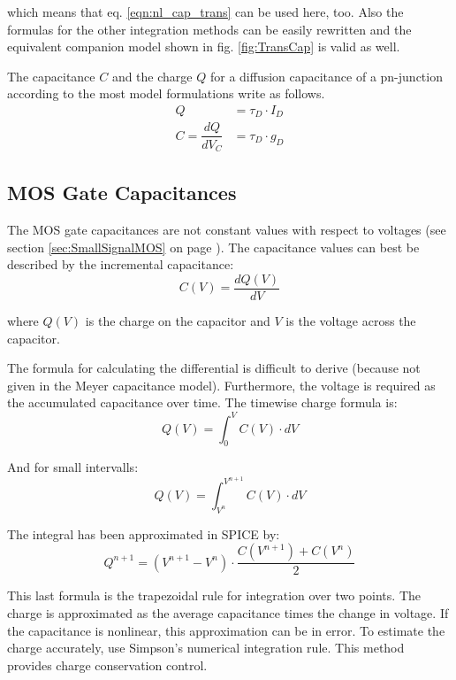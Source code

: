 which means that eq. \eqref{eqn:nl_cap_trans} can be used here, too.
Also the formulas for the other integration methods can be
easily rewritten and the equivalent companion model shown in
fig. \ref{fig:TransCap} is valid as well.

\addvspace{12pt}

The capacitance $C$ and the charge $Q$ for a diffusion capacitance of
a pn-junction according to the most model formulations write as
follows.
\begin{align}
Q &= \tau_D\cdot I_D\\
C = \dfrac{d Q}{d V_C} &= \tau_D\cdot g_D
\end{align}

\subsection{MOS Gate Capacitances}

The MOS gate capacitances are not constant values with respect to
voltages (see section \ref{sec:SmallSignalMOS} on page
\pageref{sec:SmallSignalMOS}). The capacitance values can best be
described by the incremental capacitance:
\begin{equation}
C(V) = \dfrac{d Q(V)}{d V}
\end{equation}

where $Q(V)$ is the charge on the capacitor and $V$ is the voltage
across the capacitor.

\addvspace{12pt}

The formula for calculating the differential is difficult to derive
(because not given in the Meyer capacitance model).  Furthermore, the
voltage is required as the accumulated capacitance over time.  The
timewise charge formula is:
\begin{equation}
Q(V) = \int^{V}_{0} C(V)\cdot dV
\end{equation}

And for small intervalls:
\begin{equation}
Q(V) = \int^{V^{n+1}}_{V^{n}} C(V)\cdot dV
\end{equation}

The integral has been approximated in SPICE by:
\begin{equation}
Q^{n+1} = \left(V^{n+1} - V^{n}\right)\cdot \dfrac{C(V^{n+1}) + C(V^{n})}{2}
\end{equation}

This last formula is the trapezoidal rule for integration over two
points.  The charge is approximated as the average capacitance times
the change in voltage.  If the capacitance is nonlinear, this
approximation can be in error.  To estimate the charge accurately, use
Simpson's numerical integration rule.  This method provides charge
conservation control.

